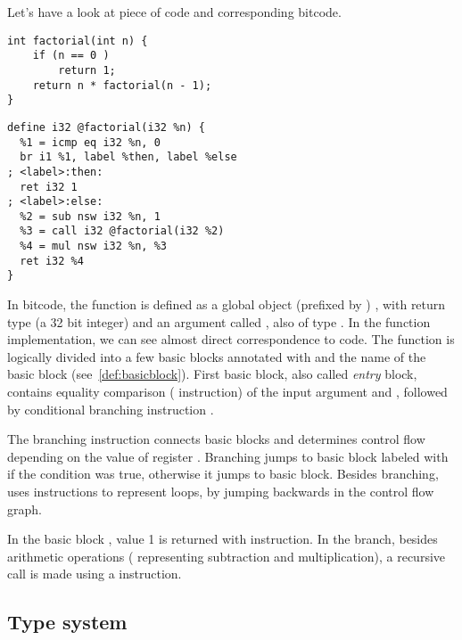 \begin{example}
Let's have a look at piece of \Cpp{} code and corresponding \LLVM bitcode.

\begin{verbatim}
int factorial(int n) {
    if (n == 0 )
        return 1;
    return n * factorial(n - 1);
}
\end{verbatim}

\begin{verbatim}
define i32 @factorial(i32 %n) {
  %1 = icmp eq i32 %n, 0
  br i1 %1, label %then, label %else
; <label>:then:
  ret i32 1
; <label>:else:
  %2 = sub nsw i32 %n, 1
  %3 = call i32 @factorial(i32 %2)
  %4 = mul nsw i32 %n, %3
  ret i32 %4
}
\end{verbatim}

\noindent
In \LLVM bitcode, the  function is defined as a
global object (prefixed by ) 
, with return type  (a 32 bit integer) and an
argument called , also of type . In the function
implementation, we can see almost direct correspondence to \Cpp{} code.
The function is logically divided into a few basic blocks annotated with
 and the name of the basic block
(see~\autoref{def:basicblock}). First basic block, also called
\emph{entry} block, contains equality comparison (
instruction) of the input argument  and , followed by
conditional branching instruction .

The branching instruction connects basic blocks and determines control flow
depending on the value of register . Branching jumps to basic
block labeled with  if the condition  was true,
otherwise it jumps to  basic block. Besides branching, \LLVM
uses  instructions to represent loops, by jumping backwards in the
control flow graph.

In the basic block , value 1 is returned with 
instruction. In the  branch, besides arithmetic operations
( representing subtraction and  multiplication), a
recursive call is made using a  instruction.
\end{example}

\subsection{Type system} \label{subsec:typesystem}

